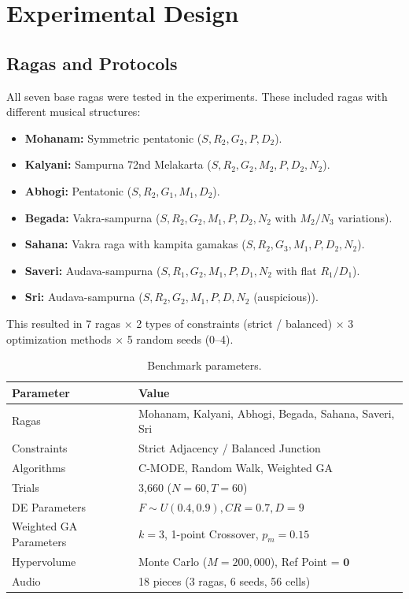 \documentclass[conference,letterpaper]{IEEEtran}
\begin{document}
\section{Experimental Design}
\subsection{Ragas and Protocols}
All seven base ragas were tested in the experiments. These included ragas with different musical structures:
\begin{itemize}
    \item \textbf{Mohanam:} Symmetric pentatonic ($S, R_2, G_2, P, D_2$).
    \item \textbf{Kalyani:} Sampurna 72nd Melakarta ($S, R_2, G_2, M_2, P, D_2, N_2$).
    \item \textbf{Abhogi:} Pentatonic ($S, R_2, G_1, M_1, D_2$).
    \item \textbf{Begada:} Vakra-sampurna ($S, R_2, G_2, M_1, P, D_2, N_2$ with $M_2/N_3$ variations).
    \item \textbf{Sahana:} Vakra raga with kampita gamakas ($S, R_2, G_3, M_1, P, D_2, N_2$).
    \item \textbf{Saveri:} Audava-sampurna ($S, R_1, G_2, M_1, P, D_1, N_2$ with flat $R_1/D_1$).
    \item \textbf{Sri:} Audava-sampurna ($S, R_2, G_2, M_1, P, D, N_2$ (auspicious)).
\end{itemize}
This resulted in 7 ragas $\times$ 2 types of constraints (strict / balanced) $\times$ 3 optimization methods $\times$ 5 random seeds (0--4).

\begin{table}[t]
\caption{Benchmark parameters.}
\label{tab:settings}
\centering\footnotesize
\begin{tabular}{@{}lp{}@{}}
\toprule
Parameter & Value\\
\midrule
Ragas & Mohanam, Kalyani, Abhogi, Begada, Sahana, Saveri, Sri\\
Constraints & Strict Adjacency / Balanced Junction\\
Algorithms & C-MODE, Random Walk, Weighted GA\\
Trials & 3,660 ($N = 60, T = 60$)\\
DE Parameters & $F \sim U(0.4, 0.9), CR = 0.7, D = 9$\\
Weighted GA Parameters & $k = 3$, 1-point Crossover, $p_m = 0.15$\\
Hypervolume & Monte Carlo ($M = 200,000$), Ref Point = $\mathbf{0}$\\
Audio & 18 pieces (3 ragas, 6 seeds, 56 cells)\\
\bottomrule
\end{tabular}
\end{table}
\end{document}
